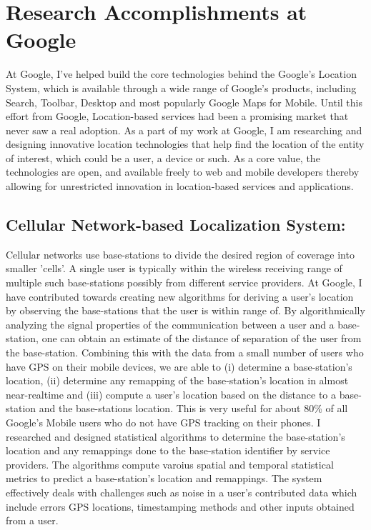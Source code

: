 \documentclass[11pt,letterpaper]{article}
\begin{document}
\section*{Research Accomplishments at Google}
At Google, I've helped build the core technologies behind the Google's Location System, which is available through a
wide range of Google's products, including Search, Toolbar, Desktop and most popularly Google Maps for Mobile. Until 
this effort from Google, Location-based services had been a promising market that never saw a real adoption. As a part
of my work at Google, I am researching and designing innovative location technologies that help find the location of
the entity of interest, which could be a user, a device or such. As a core value, the technologies are open, and available
freely to web and mobile developers thereby allowing for unrestricted innovation in location-based services and applications.

\subsection*{Cellular Network-based Localization System:} Cellular networks use base-stations to divide the desired region
of coverage into smaller 'cells'. A single user is typically within the wireless receiving range of multiple such
base-stations possibly from different service providers. At Google, I have contributed towards creating new algorithms
for deriving a user's location by observing the base-stations that the user is within range of. By algorithmically
analyzing the signal properties of the communication between a user and a base-station, one can obtain an estimate of
the distance of separation of the user from the base-station. Combining this with the data from a small number of users
who have GPS on their mobile devices, we are able to (i) determine a base-station's location, (ii) determine any
remapping of the base-station's location in almost near-realtime and (iii) compute a user's location based on the
distance to a base-station and the base-stations location. This is very useful for about 80\% of all Google's Mobile
users who do not have GPS tracking on their phones. I researched and designed statistical algorithms to determine
the base-station's location and any remappings done to the base-station identifier by service providers. The algorithms
compute varoius spatial and temporal statistical metrics to predict a base-station's location and remappings. The system
effectively deals with challenges such as noise in a user's contributed data which include errors GPS locations,
timestamping methods and other inputs obtained from a user.
\end{document}
